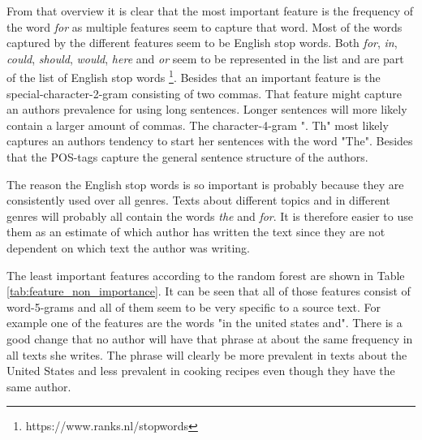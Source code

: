From that overview it is clear that the most important feature is the frequency
of the word \textit{for} as multiple features seem to capture that word. Most
of the words captured by the different features seem to be English stop words.
Both \textit{for}, \textit{in}, \textit{could}, \textit{should}, \textit{would},
\textit{here} and \textit{or} seem to be represented in the list and are part
of the list of English stop words \footnote{https://www.ranks.nl/stopwords}.
Besides that an important feature is the special-character-2-gram consisting
of two commas. That feature might capture an authors prevalence for using long
sentences. Longer sentences will more likely contain a larger amount of commas.
The character-4-gram ". Th" most likely captures an authors tendency to start
her sentences with the word "The". Besides that the \gls{POS}-tags capture the
general sentence structure of the authors.

The reason the English stop words is so important is probably because they are
consistently used over all genres. Texts about different topics and in different
genres will probably all contain the words \textit{the} and \textit{for}. It is
therefore easier to use them as an estimate of which author has written the text
since they are not dependent on which text the author was writing.

The least important features according to the random forest are shown in Table
\ref{tab:feature_non_importance}. It can be seen that all of those features
consist of word-5-grams and all of them seem to be very specific to a source
text. For example one of the features are the words "in the united states and".
There is a good change that no author will have that phrase at about the same
frequency in all texts she writes. The phrase will clearly be more prevalent in
texts about the United States and less prevalent in cooking recipes even though
they have the same author.


